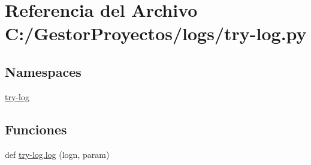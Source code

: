 \hypertarget{try-log_8py}{}\section{Referencia del Archivo C\+:/\+Gestor\+Proyectos/logs/try-\/log.py}
\label{try-log_8py}
\subsection*{Namespaces}
\begin{DoxyCompactItemize}
\item 
 \hyperlink{namespacetry-log}{try-\/log}
\end{DoxyCompactItemize}
\subsection*{Funciones}
\begin{DoxyCompactItemize}
\item 
def \hyperlink{namespacetry-log_a607f930d321d8d73b543b77913d03e6c}{try-\/log.\+log} (logn, param)
\end{DoxyCompactItemize}
